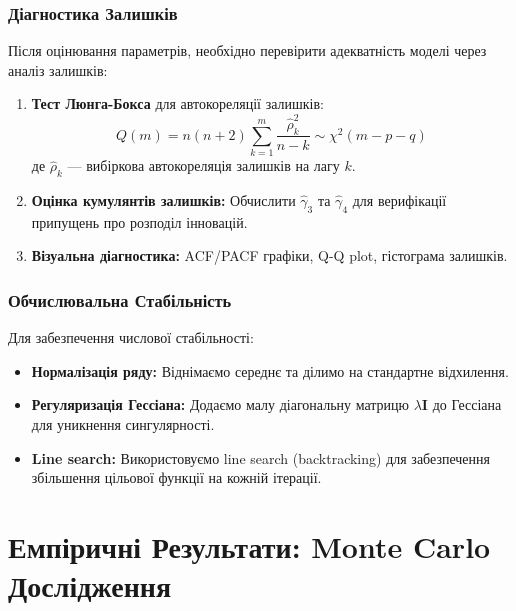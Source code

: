 \documentclass[12pt,a4paper]{article}
\begin{document}
	\subsubsection{Діагностика Залишків}
	
	Після оцінювання параметрів, необхідно перевірити адекватність моделі через аналіз залишків:
	
	\begin{enumerate}
		\item \textbf{Тест Люнга-Бокса} для автокореляції залишків:
		\begin{equation}
			\label{eq:ljung_box}
			Q(m) = n(n+2) \sum_{k=1}^{m} \frac{\hat{\rho}_k^2}{n-k} \sim \chi^2(m - p - q)
		\end{equation}
		де $\hat{\rho}_k$ --- вибіркова автокореляція залишків на лагу $k$.
		
		\item \textbf{Оцінка кумулянтів залишків:} Обчислити $\hat{\gamma}_3$ та $\hat{\gamma}_4$ для верифікації припущень про розподіл інновацій.
		
		\item \textbf{Візуальна діагностика:} ACF/PACF графіки, Q-Q plot, гістограма залишків.
	\end{enumerate}
	
	\subsubsection{Обчислювальна Стабільність}
	
	Для забезпечення числової стабільності:
	
	\begin{itemize}
		\item \textbf{Нормалізація ряду:} Віднімаємо середнє та ділимо на стандартне відхилення.
		
		\item \textbf{Регуляризація Гессіана:} Додаємо малу діагональну матрицю $\lambda \mathbf{I}$ до Гессіана для уникнення сингулярності.
		
		\item \textbf{Line search:} Використовуємо line search (backtracking) для забезпечення збільшення цільової функції на кожній ітерації.
	\end{itemize}
	
	\section{Емпіричні Результати: Monte Carlo Дослідження}
	\label{sec:empirical}
	
\end{document}
